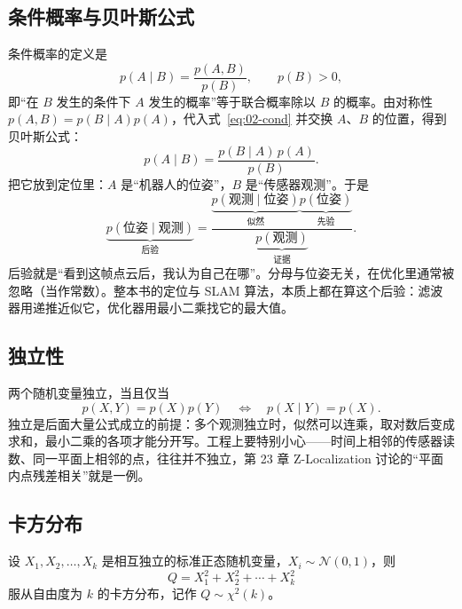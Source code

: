 \subsection{条件概率与贝叶斯公式}

条件概率的定义是
\begin{equation}
p(A\mid B)=\frac{p(A,B)}{p(B)},\qquad p(B)>0,
\label{eq:02-cond}
\end{equation}
即“在 $B$ 发生的条件下 $A$ 发生的概率”等于联合概率除以 $B$ 的概率。由对称性 $p(A,B)=p(B\mid A)p(A)$，代入式~\eqref{eq:02-cond} 并交换 $A$、$B$ 的位置，得到贝叶斯公式：
\begin{equation}
p(A\mid B)=\frac{p(B\mid A)\,p(A)}{p(B)}.
\label{eq:02-bayes}
\end{equation}
把它放到定位里：$A$ 是“机器人的位姿”，$B$ 是“传感器观测”。于是
\begin{equation}
\underbrace{p(\text{位姿}\mid\text{观测})}_{\text{后验}}
=\frac{\underbrace{p(\text{观测}\mid\text{位姿})}_{\text{似然}}\underbrace{p(\text{位姿})}_{\text{先验}}}
{\underbrace{p(\text{观测})}_{\text{证据}}}.
\end{equation}
后验就是“看到这帧点云后，我认为自己在哪”。分母与位姿无关，在优化里通常被忽略（当作常数）。整本书的定位与 SLAM 算法，本质上都在算这个后验：滤波器用递推近似它，优化器用最小二乘找它的最大值。

\subsection{独立性}

两个随机变量独立，当且仅当
\begin{equation}
p(X,Y)=p(X)p(Y)\quad\Longleftrightarrow\quad p(X\mid Y)=p(X).
\end{equation}
独立是后面大量公式成立的前提：多个观测独立时，似然可以连乘，取对数后变成求和，最小二乘的各项才能分开写。工程上要特别小心——时间上相邻的传感器读数、同一平面上相邻的点，往往并不独立，第 23 章 Z-Localization 讨论的“平面内点残差相关”就是一例。

\subsection{卡方分布}

\begin{definition}[卡方分布]
设 $X_1,X_2,\dots,X_k$ 是相互独立的标准正态随机变量，$X_i\sim\mathcal{N}(0,1)$，则
\begin{equation}
Q=X_1^{2}+X_2^{2}+\cdots+X_k^{2}
\end{equation}
服从自由度为 $k$ 的卡方分布，记作 $Q\sim\chi^{2}(k)$。
\end{definition}


